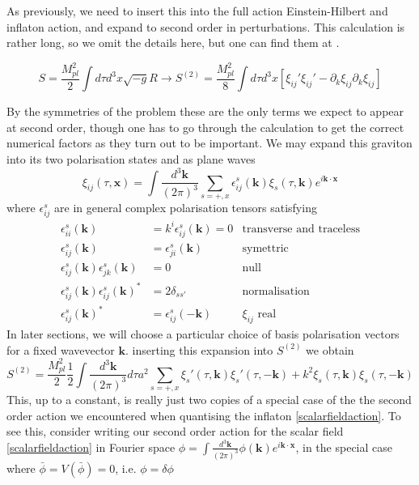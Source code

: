 \documentclass[a4paper,10pt]{article}
\renewcommand{\v}[1]{\mathbf{#1}}
\newcommand{\Mp}{M_{pl}}
\newcommand{\half}{\frac{1}{2}}
\newcommand{\bphi}{\bar{\phi}}
\newcommand{\fint}[1]{\int \frac{d^3 \v{#1}}{(2\pi)^3}}
\begin{document}
As previously, we need to insert this into the full action Einstein-Hilbert and inflaton action, and expand to second order in perturbations. This calculation is rather long, so we omit the details here, but one can find them at \cite{wang}. 

\begin{equation}
S=\frac{\Mp^2}{2} \int d\tau d^3x \sqrt{-g}R \rightarrow S^{(2)} = \frac{\Mp^2}{8}\int d\tau d^3x [\xi_{ij}'\xi_{ij}'-\partial_k\xi_{ij}\partial_k\xi_{ij}]
\end{equation}

By the symmetries of the problem these are the only terms we expect to appear at second order, though one has to go through the calculation to get the correct numerical factors as they turn out to be important. We may expand this graviton into its two polarisation states and as plane waves \cite{pajer}
\begin{equation}
\xi_{ij}(\tau, \v{x}) = \fint{k} \sum_{s=+,x} \epsilon_{ij}^s(\v{k})\xi_s(\tau,\v{k})e^{i\v{k}\cdot\v{x}}
\end{equation}
where $\epsilon_{ij}^s$ are in general complex polarisation tensors satisfying
\begin{align}
\epsilon_{ii}^s(\v{k}) &= k^i \epsilon_{ij}^s(\v{k}) = 0 &\text{transverse and traceless}\\
\label{polarisation1}
\epsilon_{ij}^s(\v{k}) &= \epsilon_{ji}^s(\v{k}) &\text{symettric}\\
\epsilon_{ij}^s(\v{k})\epsilon_{jk}^s(\v{k}) &= 0&\text{null}\\
\epsilon_{ij}^s(\v{k})\epsilon_{ij}^s(\v{k})^* &= 2\delta_{ss'} &\text{normalisation}\\
\epsilon_{ij}^s(\v{k})^* &= \epsilon_{ij}^s(\v{-k})&\text{$\xi_{ij}$ real}
\label{polarisation2}
\end{align}
In later sections, we will choose a particular choice of basis polarisation vectors for a fixed wavevector $\v{k}$. inserting this expansion into $S^{(2)}$ we obtain 
\begin{equation}
S^{(2)} = \frac{\Mp^2}{2} \half \fint{k} d\tau a^2 \sum_{s=+,x} \xi_s'(\tau,\v{k})\xi_s '(\tau,\v{-k})+k^2 \xi_s(\tau,\v{k})\xi_s (\tau,\v{-k})
\label{gravwaveaction}
\end{equation}
This, up to a constant, is really just two copies of a special case of the the second order action we encountered when quantising the inflaton \ref{scalarfieldaction}. To see this, consider writing our second order action for the scalar field \ref{scalarfieldaction} in Fourier space $\phi = \fint{k} \phi(\v{k})e^{i\v{k}\cdot\v{x}}$, in the special case where $\bphi = V(\bphi) = 0$, i.e. $\phi = \delta \phi$
\end{document}
